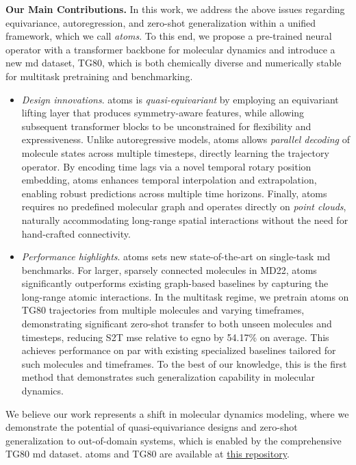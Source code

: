 \textbf{Our Main Contributions.} In this work, we address the above issues regarding equivariance, autoregression, and zero-shot generalization within a unified framework, which we call \textit{\gls{atoms}}. To this end, we propose a pre-trained neural operator with a transformer backbone for molecular dynamics and introduce a new \gls{md} dataset, TG80, which is both chemically diverse and numerically stable for multitask pretraining and benchmarking. 
\begin{itemize}[leftmargin=0.15in]
    \item \textit{Design innovations}. \gls{atoms} is \textit{quasi-equivariant} by employing an equivariant lifting layer that produces symmetry-aware features, while allowing subsequent transformer blocks to be unconstrained for flexibility and expressiveness. 
    Unlike autoregressive models, \gls{atoms} allows \textit{parallel decoding} of molecule states across multiple timesteps, directly learning the trajectory operator. By encoding time lags via a novel temporal rotary position embedding, \gls{atoms} enhances temporal interpolation and extrapolation, enabling robust predictions across multiple time horizons. Finally, \gls{atoms} requires no predefined molecular graph and operates directly on \textit{point clouds}, naturally accommodating long-range spatial interactions without the need for hand-crafted connectivity. 

    \item \textit{Performance highlights}. \gls{atoms} sets new state-of-the-art on single-task \gls{md} benchmarks. For larger, sparsely connected molecules in MD22, \gls{atoms} significantly outperforms existing graph-based baselines by capturing the long-range atomic interactions. In the multitask regime, we pretrain \gls{atoms} on TG80 trajectories from multiple molecules and varying timeframes, demonstrating significant zero-shot transfer to both unseen molecules and timesteps, reducing S2T \gls{mse} relative to \gls{egno} by 54.17\% on average. This achieves performance on par with existing specialized baselines tailored for such molecules and timeframes.  To the best of our knowledge, this is the first method that demonstrates such generalization capability in molecular dynamics.
\end{itemize}

We believe our work represents a shift in molecular dynamics modeling, where we demonstrate the potential of quasi-equivariance designs and zero-shot generalization to out-of-domain systems, which is enabled by the comprehensive TG80 \gls{md} dataset. \gls{atoms} and TG80 are available at \href{https://github.com/luke-a-thompson/ATOM}{this repository}.



